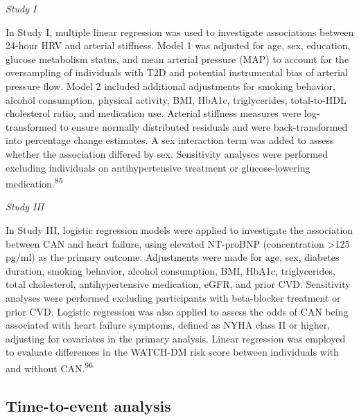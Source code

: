 \documentclass[
  a4paper,
  headsepline=true,
  open=left]{scrbook}
\begin{document}
\emph{Study I}

In Study I, multiple linear regression was used to investigate
associations between 24-hour HRV and arterial stiffness. Model 1 was
adjusted for age, sex, education, glucose metabolism status, and mean
arterial pressure (MAP) to account for the oversampling of individuals
with T2D and potential instrumental bias of arterial pressure flow.
Model 2 included additional adjustments for smoking behavior, alcohol
consumption, physical activity, BMI, HbA1c, triglycerides, total-to-HDL
cholesterol ratio, and medication use. Arterial stiffness measures were
log-transformed to ensure normally distributed residuals and were
back-transformed into percentage change estimates. A sex interaction
term was added to assess whether the association differed by sex.
Sensitivity analyses were performed excluding individuals on
antihypertensive treatment or glucose-lowering
medication.\textsuperscript{85}

\emph{Study III}

In Study III, logistic regression models were applied to investigate the
association between CAN and heart failure, using elevated NT-proBNP
(concentration \textgreater125 pg/ml) as the primary outcome.
Adjustments were made for age, sex, diabetes duration, smoking behavior,
alcohol consumption, BMI, HbA1c, triglycerides, total cholesterol,
antihypertensive medication, eGFR, and prior CVD. Sensitivity analyses
were performed excluding participants with beta-blocker treatment or
prior CVD. Logistic regression was also applied to assess the odds of
CAN being associated with heart failure symptoms, defined as NYHA class
II or higher, adjusting for covariates in the primary analysis. Linear
regression was employed to evaluate differences in the WATCH-DM risk
score between individuals with and without CAN.\textsuperscript{96}

\hypertarget{time-to-event-analysis}{%
\subsection{Time-to-event analysis}\label{time-to-event-analysis}}
\end{document}
